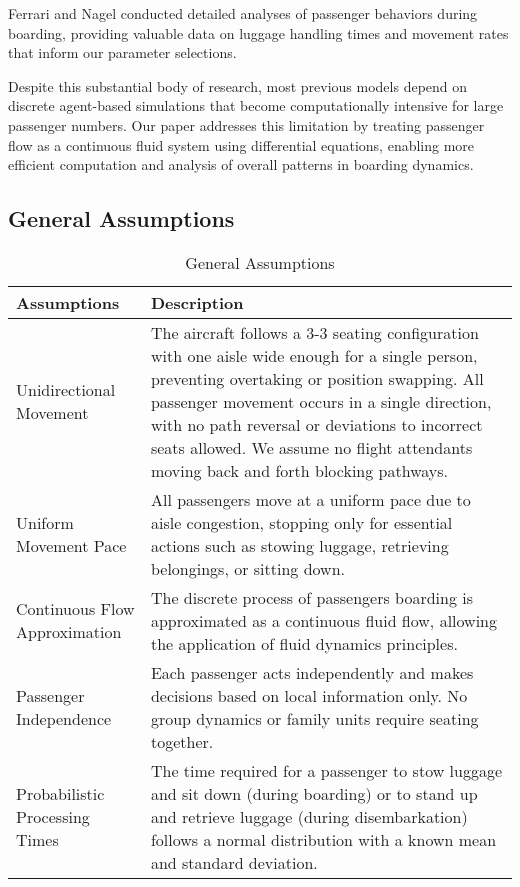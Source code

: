 \documentclass[12pt,a4paper]{article}
\begin{document}
Ferrari and Nagel \cite{ferrari2005} conducted detailed analyses of passenger behaviors during boarding, providing valuable data on luggage handling times and movement rates that inform our parameter selections.

Despite this substantial body of research, most previous models depend on discrete agent-based simulations that become computationally intensive for large passenger numbers. Our paper addresses this limitation by treating passenger flow as a continuous fluid system using differential equations, enabling more efficient computation and analysis of overall patterns in boarding dynamics.

\subsection{General Assumptions}
\begin{table}[H]
\centering
\begin{tabular}{|p{3cm}|p{11cm}|}
\hline
\textbf{Assumptions} & \textbf{Description} \\ \hline
Unidirectional Movement & The aircraft follows a 3-3 seating configuration with one aisle wide enough for a single person, preventing overtaking or position swapping. All passenger movement occurs in a single direction, with no path reversal or deviations to incorrect seats allowed. We assume no flight attendants moving back and forth blocking pathways. \\ \hline
Uniform Movement Pace & All passengers move at a uniform pace due to aisle congestion, stopping only for essential actions such as stowing luggage, retrieving belongings, or sitting down. \\ \hline
Continuous Flow Approximation & The discrete process of passengers boarding is approximated as a continuous fluid flow, allowing the application of fluid dynamics principles. \\ \hline
Passenger Independence & Each passenger acts independently and makes decisions based on local information only. No group dynamics or family units require seating together. \\ \hline
Probabilistic Processing Times & The time required for a passenger to stow luggage and sit down (during boarding) or to stand up and retrieve luggage (during disembarkation) follows a normal distribution with a known mean and standard deviation. \\ \hline
\end{tabular}
\caption{General Assumptions}
\label{tab:assumptions}
\end{table}
\end{document}
